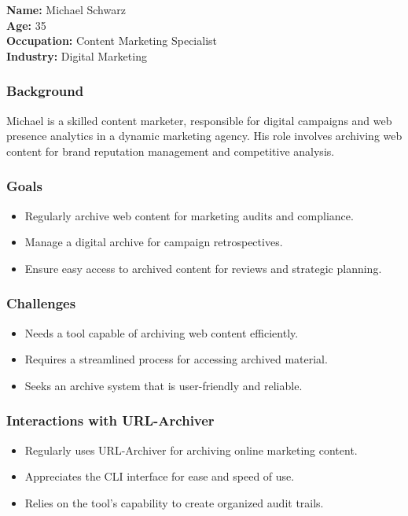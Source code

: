 \textbf{Name:} Michael Schwarz \\
\textbf{Age:} 35 \\
\textbf{Occupation:} Content Marketing Specialist \\
\textbf{Industry:} Digital Marketing

\subsubsection{Background}
Michael is a skilled content marketer, responsible for digital campaigns and web presence analytics in a dynamic marketing agency.
His role involves archiving web content for brand reputation management and competitive analysis.

\subsubsection{Goals}
\begin{itemize}
    \item Regularly archive web content for marketing audits and compliance.
    \item Manage a digital archive for campaign retrospectives.
    \item Ensure easy access to archived content for reviews and strategic planning.
\end{itemize}

\subsubsection{Challenges}
\begin{itemize}
    \item Needs a tool capable of archiving web content efficiently.
    \item Requires a streamlined process for accessing archived material.
    \item Seeks an archive system that is user-friendly and reliable.
\end{itemize}

\subsubsection{Interactions with URL-Archiver}
\begin{itemize}
    \item Regularly uses URL-Archiver for archiving online marketing content.
    \item Appreciates the CLI interface for ease and speed of use.
    \item Relies on the tool's capability to create organized audit trails.
\end{itemize}


